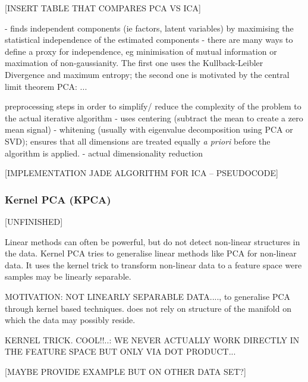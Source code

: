 \documentclass[journal, a4paper]{IEEEtran}
\begin{document}
[INSERT TABLE THAT COMPARES PCA VS ICA] 



- finds independent components (ie factors, latent variables) by maximising the statistical independence of the estimated components
- there are many ways to define a proxy for independence, eg minimisation of mutual information or maximation of non-gaussianity. The first one uses the Kullback-Leibler Divergence and maximum entropy; the second one is motivated by the central limit theorem %
PCA:
...

preprocessing steps in order to simplify/ reduce the complexity of the problem to the actual iterative algorithm
- uses centering (subtract the mean to create a zero mean signal)
- whitening (usually with eigenvalue decomposition using PCA or SVD); ensures that all dimensions are treated equally \textit{a priori} before the algorithm is applied. 
- actual dimensionality reduction 

[IMPLEMENTATION JADE ALGORITHM FOR ICA -- PSEUDOCODE]



\hfill
\subsubsection{Kernel PCA (KPCA)}
[UNFINISHED]

Linear methods can often be powerful, but do not detect non-linear structures in the data.
Kernel PCA tries to generalise linear methods like PCA for non-linear data.
It uses the kernel trick to transform non-linear data to a feature space were samples may be linearly separable.

MOTIVATION: NOT LINEARLY SEPARABLE DATA...., to generalise PCA through kernel based techniques. does not rely on structure of the manifold on which the data may possibly reside. 

KERNEL TRICK. COOL!!..: WE NEVER ACTUALLY WORK DIRECTLY IN THE FEATURE SPACE BUT ONLY VIA DOT PRODUCT...


[MAYBE PROVIDE EXAMPLE BUT ON OTHER DATA SET?]
\end{document}
